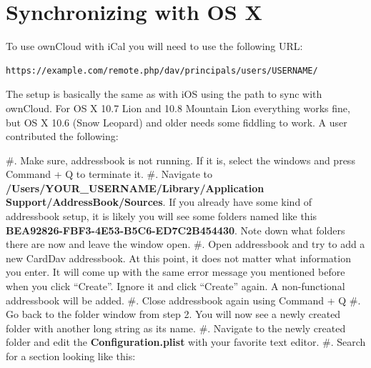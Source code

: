 \documentclass[letterpaper,10pt,english]{sphinxmanual}
\begin{document}
\section{Synchronizing with OS X}
\label{pim/sync_osx::doc}\label{pim/sync_osx:synchronizing-with-os-x}
To use ownCloud with iCal you will need to use the following URL:

\begin{Verbatim}[commandchars=\\\{\}]
https://example.com/remote.php/dav/principals/users/USERNAME/
\end{Verbatim}

The setup is basically the same as with iOS using the path 
to sync with ownCloud. For OS X 10.7 Lion and 10.8 Mountain Lion everything works
fine, but OS X 10.6 (Snow Leopard) and older needs some fiddling to work. A user
contributed the following:

\#. Make sure, addressbook is not running. If it is, select the windows and press
Command + Q to terminate it.
\#. Navigate to \textbf{/Users/YOUR\_USERNAME/Library/Application Support/AddressBook/Sources}.
If you already have some kind of addressbook setup, it is likely you will see
some folders named like this \textbf{BEA92826-FBF3-4E53-B5C6-ED7C2B454430}.
Note down what folders there are now and leave the window open.
\#. Open addressbook and try to add a new CardDav addressbook. At this point, it
does not matter what information you enter. It will come up with the same error
message you mentioned before when you click ``Create''. Ignore it and click ``Create''
again. A non-functional addressbook will be added.
\#. Close addressbook again using Command + Q
\#. Go back to the folder window from step 2. You will now see a newly created folder
with another long string as its name.
\#. Navigate to the newly created folder and edit the \textbf{Configuration.plist} with
your favorite text editor.
\#. Search for a section looking like this:
\end{document}
